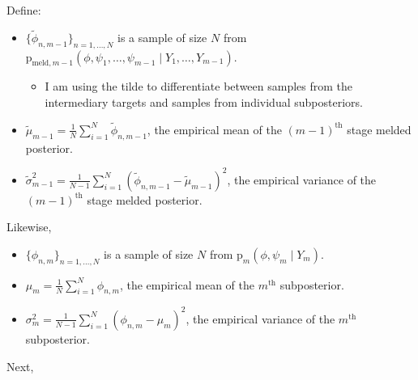 \documentclass[10pt,a4paper,]{article}
\providecommand{\tightlist}{%
  \setlength{\itemsep}{0pt}\setlength{\parskip}{0pt}}
\newcommand{\pd}{\text{p}}
\newcommand{\Nx}{N}
\newcommand{\sampleindex}{n}
\newcommand{\modelindex}{m}
\begin{document}
Define:

\begin{itemize}
\item
  \(\{\tilde{\phi}_{\sampleindex, \modelindex - 1}\}_{\sampleindex = 1, \ldots, \Nx}\)
  is a sample of size \(\Nx\) from
  \(\pd_{\text{meld}, \modelindex - 1}(\phi, \psi_{1}, \ldots, \psi_{\modelindex - 1} \mid Y_{1}, \ldots, Y_{\modelindex - 1})\).

  \begin{itemize}
  \tightlist
  \item
    I am using the tilde to differentiate between samples from the
    intermediary targets and samples from individual subposteriors.
  \end{itemize}
\item
  \(\tilde{\mu}_{\modelindex - 1} = \frac{1}{\Nx}\sum\limits_{i = 1}^{\Nx}\tilde{\phi}_{\sampleindex, \modelindex - 1}\),
  the empirical mean of the \((\modelindex - 1)^{\text{th}}\) stage
  melded posterior.
\item
  \(\tilde{\sigma}^{2}_{\modelindex - 1} = \frac{1}{\Nx - 1}\sum\limits_{i = 1}^{\Nx} (\tilde{\phi}_{\sampleindex, \modelindex - 1} - \tilde{\mu}_{\modelindex - 1})^{2}\),
  the empirical variance of the \((\modelindex - 1)^{\text{th}}\) stage
  melded posterior.
\end{itemize}

Likewise,

\begin{itemize}
\tightlist
\item
  \(\{\phi_{\sampleindex, \modelindex}\}_{\sampleindex = 1, \ldots, \Nx}\)
  is a sample of size \(\Nx\) from
  \(\pd_{\modelindex}(\phi, \psi_{\modelindex} \mid Y_{\modelindex})\).
\item
  \(\mu_{\modelindex} = \frac{1}{\Nx}\sum\limits_{i = 1}^{\Nx}\phi_{\sampleindex, \modelindex}\),
  the empirical mean of the \(\modelindex^{\text{th}}\) subposterior.
\item
  \(\sigma^{2}_{\modelindex} = \frac{1}{\Nx - 1}\sum\limits_{i = 1}^{\Nx} (\phi_{\sampleindex, \modelindex} - \mu_{\modelindex})^{2}\),
  the empirical variance of the \(\modelindex^{\text{th}}\)
  subposterior.
\end{itemize}

Next,
\end{document}
